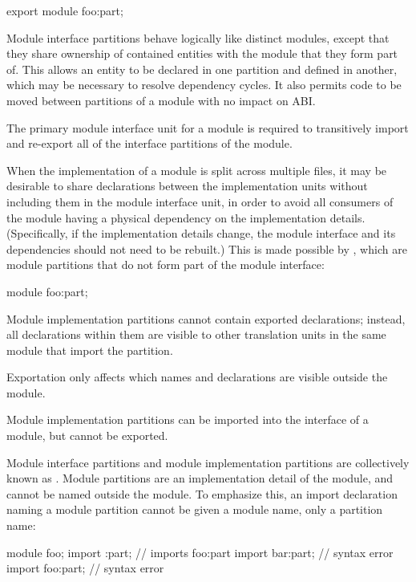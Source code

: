\begin{codeblock}
export module foo:part;
\end{codeblock}

\pnum
Module interface partitions behave logically like distinct modules,
except that they share ownership of contained entities
with the module that they form part of.
This allows an entity to be declared in one partition
and defined in another,
which may be necessary to resolve
dependency cycles.
It also permits code to be moved between partitions of a module
with no impact on ABI.

\pnum
The primary module interface unit for a module is required
to transitively import and re-export all of the interface
partitions of the module.

\pnum
When the implementation of a module is split across multiple files,
it may be desirable to share declarations between the implementation units
without including them in the module interface unit,
in order to avoid all consumers of the module
having a physical dependency on the implementation details.
(Specifically, if the implementation details change,
the module interface and its dependencies should not need to be rebuilt.)
This is made possible by ,
which are module partitions that do not form part of the module interface:

\begin{codeblock}
module foo:part;
\end{codeblock}

\pnum
Module implementation partitions cannot contain exported declarations;
instead, all declarations within them are visible to other translation
units in the same module that import the partition.
\begin{note}
Exportation only affects which names and declarations are visible outside
the module.
\end{note}

\pnum
Module implementation partitions can be imported
into the interface of a module,
but cannot be exported.

\pnum
Module interface partitions and module implementation partitions
are collectively known as .
Module partitions are an implementation detail of the module,
and cannot be named outside the module.
To emphasize this, an import declaration naming a module partition
cannot be given a module name, only a partition name:

\begin{codeblock}
module foo;
import :part;           // imports foo:part
import bar:part;        // syntax error
import foo:part;        // syntax error
\end{codeblock}

